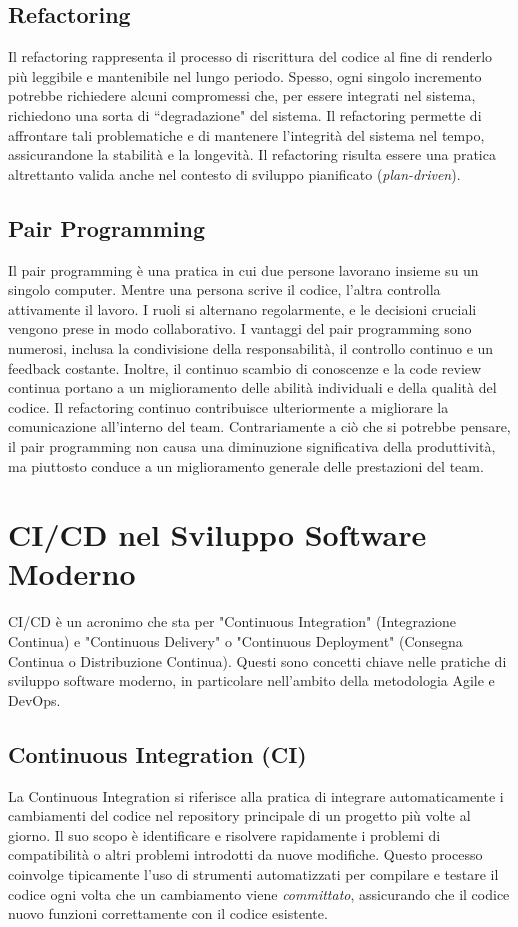 \subsection{Refactoring}
Il refactoring rappresenta il processo di riscrittura del codice al fine di renderlo più leggibile e mantenibile nel lungo periodo.
Spesso, ogni singolo incremento potrebbe richiedere alcuni compromessi che, per essere integrati nel sistema, richiedono una sorta di
``degradazione" del sistema. Il refactoring permette di affrontare tali problematiche e di mantenere l'integrità del sistema nel tempo,
assicurandone la stabilità e la longevità. Il refactoring risulta essere una pratica altrettanto valida anche nel contesto di sviluppo
pianificato (\textit{plan-driven}).

\subsection{Pair Programming}
Il pair programming è una pratica in cui due persone lavorano insieme su un singolo computer. Mentre una persona scrive il codice,
l'altra controlla attivamente il lavoro. I ruoli si alternano regolarmente, e le decisioni cruciali vengono prese in modo collaborativo.
I vantaggi del pair programming sono numerosi, inclusa la condivisione della responsabilità, il controllo continuo e un feedback costante.
Inoltre, il continuo scambio di conoscenze e la code review continua portano a un miglioramento delle abilità individuali e della qualità
del codice. Il refactoring continuo contribuisce ulteriormente a migliorare la comunicazione all'interno del team. Contrariamente a ciò
che si potrebbe pensare, il pair programming non causa una diminuzione significativa della produttività, ma piuttosto conduce a un miglioramento
generale delle prestazioni del team.
\section{CI/CD nel Sviluppo Software Moderno}

CI/CD è un acronimo che sta per "Continuous Integration" (Integrazione Continua)
e "Continuous Delivery" o "Continuous Deployment" (Consegna Continua o Distribuzione Continua). Questi sono concetti chiave nelle pratiche di
sviluppo software moderno, in particolare nell'ambito della metodologia Agile e DevOps.

\subsection{Continuous Integration (CI)}
La Continuous Integration si riferisce alla pratica di integrare automaticamente i cambiamenti del codice nel repository principale di un progetto
più volte al giorno. Il suo scopo è identificare e risolvere rapidamente i problemi di compatibilità o altri problemi introdotti da nuove modifiche.
Questo processo coinvolge tipicamente l'uso di strumenti automatizzati per compilare e testare il codice ogni volta che un cambiamento viene \textit{committato},
assicurando che il codice nuovo funzioni correttamente con il codice esistente.

